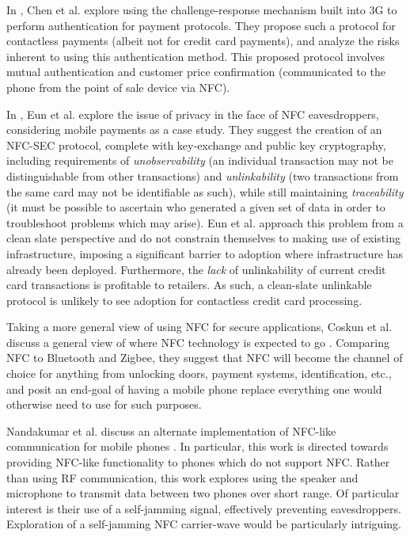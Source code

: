 
In \cite{chen2010using}, Chen et al. explore using the challenge-response mechanism built into 3G to perform authentication for payment protocols.
They propose such a protocol for contactless payments (albeit not for credit card payments), and analyze the risks inherent to using this authentication method.
This proposed protocol involves mutual authentication and customer price confirmation (communicated to the phone from the point of sale device via NFC).

In \cite{eun2013conditional}, Eun et al. explore the issue of privacy in the face of NFC eavesdroppers, considering mobile payments as a case study.
They suggest the creation of an NFC-SEC protocol, complete with key-exchange and public key cryptography, including requirements of
    \emph{unobservability} (an individual transaction may not be distinguishable from other transactions) and
    \emph{unlinkability} (two transactions from the same card may not be identifiable as such), while still maintaining
    \emph{traceability} (it must be possible to ascertain who generated a given set of data in order to troubleshoot problems which may arise).
Eun et al. approach this problem from a clean slate perspective and do not constrain themselves to making use of existing infrastructure,
    imposing a significant barrier to adoption where infrastructure has already been deployed.
Furthermore, the \emph{lack} of unlinkability of current credit card transactions is profitable to retailers.
As such, a clean-slate unlinkable protocol is unlikely to see adoption for contactless credit card processing.

Taking a more general view of using NFC for secure applications,
    Coskun et al. discuss a general view of where NFC technology is expected to go \cite{Coskun2013}.
Comparing NFC to Bluetooth and Zigbee, they suggest that NFC will become the channel of choice for anything from unlocking doors, payment systems, identification, etc.,
    and posit an end-goal of having a mobile phone replace everything one would otherwise need to use for such purposes.

Nandakumar et al. discuss an alternate implementation of NFC-like communication for mobile phones \cite{nandakumar2013dhwani}.
In particular, this work is directed towards providing NFC-like functionality to phones which do not support NFC.
Rather than using RF communication, this work explores using the speaker and microphone to transmit data between two phones over short range.
Of particular interest is their use of a self-jamming signal, effectively preventing eavesdroppers.
Exploration of a self-jamming NFC carrier-wave would be particularly intriguing.
